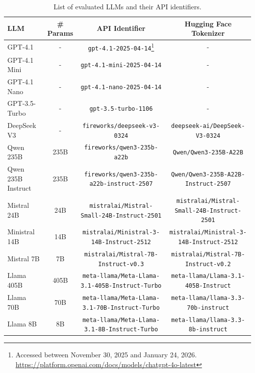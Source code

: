 \documentclass{article}
\theoremstyle{plain}
\theoremstyle{definition}
\theoremstyle{remark}
\begin{document}
\begin{table}[t]
   \caption{List of evaluated LLMs and their API identifiers.}
   \label{tab:llm-id}
   \centering
   {\scriptsize\begin{tabular}{lccc}\toprule
   LLM & \# Params & API Identifier & Hugging Face Tokenizer\\ \midrule

   GPT-4.1 & - & \texttt{gpt-4.1-2025-04-14}\footnote{Accessed between November 30, 2025 and January 24, 2026. \url{https://platform.openai.com/docs/models/chatgpt-4o-latest}} & - \\
   GPT-4.1 Mini & - & \texttt{gpt-4.1-mini-2025-04-14} & - \\
   GPT-4.1 Nano & - & \texttt{gpt-4.1-nano-2025-04-14} & - \\
   GPT-3.5-Turbo & - & \texttt{gpt-3.5-turbo-1106} & - \\

   DeepSeek V3 & - & \texttt{fireworks/deepseek-v3-0324} & \texttt{deepseek-ai/DeepSeek-V3-0324} \\
   Qwen 235B & 235B & \texttt{fireworks/qwen3-235b-a22b} & \texttt{Qwen/Qwen3-235B-A22B} \\
   Qwen 235B Instruct & 235B & \texttt{fireworks/qwen3-235b-a22b-instruct-2507} & \texttt{Qwen/Qwen3-235B-A22B-Instruct-2507} \\
   
   Mistral 24B & 24B & \texttt{mistralai/Mistral-Small-24B-Instruct-2501} & \texttt{mistralai/Mistral-Small-24B-Instruct-2501} \\
   Ministral 14B & 14B & \texttt{mistralai/Ministral-3-14B-Instruct-2512} & \texttt{mistralai/Ministral-3-14B-Instruct-2512} \\
   Mistral 7B & 7B & \texttt{mistralai/Mistral-7B-Instruct-v0.3} & \texttt{mistralai/Mistral-7B-Instruct-v0.2} \\

   Llama 405B & 405B & \texttt{meta-llama/Meta-Llama-3.1-405B-Instruct-Turbo} & \texttt{meta-llama/Llama-3.1-405B-Instruct} \\
   Llama 70B & 70B & \texttt{meta-llama/Meta-Llama-3.1-70B-Instruct-Turbo} & \texttt{meta-llama/llama-3.3-70b-instruct} \\
   Llama 8B & 8B & \texttt{meta-llama/Meta-Llama-3.1-8B-Instruct-Turbo} & \texttt{meta-llama/llama-3.3-8b-instruct} \\

   \bottomrule
   \end{tabular}}
\end{table}
\end{document}
